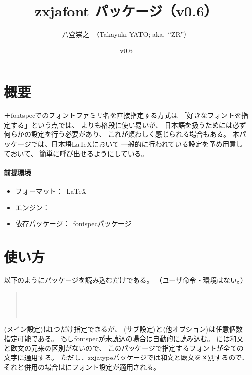 \documentclass[xelatex,ja=standard,jafont=ipaex,
  a4paper]{bxjsarticle}
\newcommand{\PkgVersion}{0.6}
\newcommand{\PkgDate}{2020/01/12}
\newcommand{\Pkg}[1]{\textsf{#1}}
\newcommand{\Meta}[1]{$\langle$\mbox{}#1\mbox{}$\rangle$}
\newcommand{\Means}{：\ }
\newcommand{\JEmph}{\textgt}
\begin{document}
\title{\Pkg{zxjafont} パッケージ（v\PkgVersion）}
\author{八登崇之\ （Takayuki YATO; aka.~``ZR''）}
\date{v\PkgVersion\quad[\PkgDate]}
\maketitle

\section{概要}

{\XeLaTeX}＋\Pkg{fontspec}でのフォントファミリ名を直接指定する方式は
「好きなフォントを指定する」という点では、
{\pLaTeX}\>よりも格段に使い易いが、
日本語を扱うためには必ず何らかの設定を行う必要があり、
これが煩わしく感じられる場合もある。
本パッケージでは、日本語{\LaTeX}\>において
一般的に行われている設定を予め用意しておいて、
簡単に呼び出せるようにしている。

\paragraph{前提環境}\mbox{}
\begin{itemize}
\item フォーマット\Means {\LaTeX}
\item エンジン\Means {\XeTeX}
\item 依存パッケージ\Means \Pkg{fontspec}パッケージ
\end{itemize}

\section{使い方}

以下のようにパッケージを読み込むだけである。
（ユーザ命令・環境はない。）
\begin{quote}\small
|\usepackage[|\Meta{メイン設定}|,|\Meta{サブ設定}|,|%
\Meta{他オプション}|]{zxjafont}|
\end{quote}

\Meta{メイン設定}は1つだけ指定できるが、
\Meta{サブ設定}と\Meta{他オプション}は任意個数指定可能である。
もし\Pkg{fontspec}が未読込の場合は自動的に読み込む。
{\XeLaTeX}\>には和文と欧文の元来の区別がないので、
このパッケージで指定するフォントが全ての文字に通用する。
ただし、\Pkg{zxjatype}パッケージでは和文と欧文を区別するので、
それと併用の場合は\JEmph{和文のみ}にフォント設定が適用される。
\end{document}
